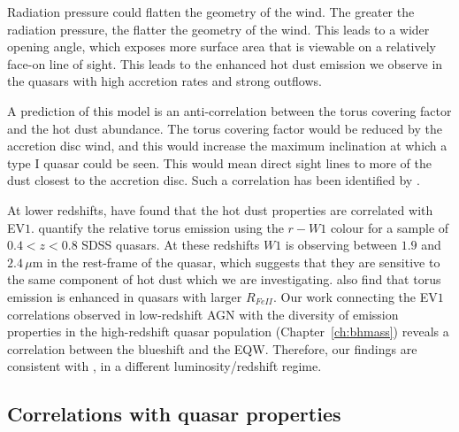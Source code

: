 Radiation pressure could flatten the geometry of the wind. 
The greater the radiation pressure, the flatter the geometry of the wind. 
This leads to a wider opening angle, which exposes more surface area that is viewable on a relatively face-on line of sight. 
This leads to the enhanced hot dust emission we observe in the quasars with high accretion rates and strong outflows. 

A prediction of this model is an anti-correlation between the torus covering factor and the hot dust abundance. 
The torus covering factor would be reduced by the accretion disc wind, and this would increase the maximum inclination at which a type I quasar could be seen. 
This would mean direct sight lines to more of the dust closest to the accretion disc. 
Such a correlation has been identified by \citet{roseboom13}. 

At lower redshifts, \citet{shen14} have found that the hot dust properties are correlated with EV$1$. 
\citet{shen14} quantify the relative torus emission using the $r-W1$ colour for a sample of $0.4 < z < 0.8$ SDSS quasars. 
At these redshifts $W1$ is observing between $1.9$ and $2.4$\,$\mu$m in the rest-frame of the quasar, which suggests that they are sensitive to the same component of hot dust which we are investigating. 
\citet{shen14} also find that torus emission is enhanced in quasars with larger $R_{FeII}$.
Our work connecting the EV$1$ correlations observed in low-redshift AGN with the diversity of  emission properties in the high-redshift quasar population (Chapter~\ref{ch:bhmass}) reveals a correlation between the  blueshift and the  EQW.
Therefore, our findings are consistent with \citet{shen14}, in a different luminosity/redshift regime. 


\subsection{Correlations with quasar properties}

